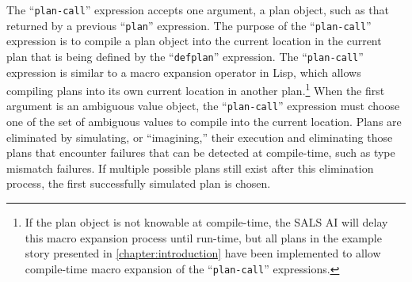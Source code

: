The ``{\tt{plan-call}}'' expression accepts one argument, a plan
object, such as that returned by a previous ``{\tt{plan}}''
expression.  The purpose of the ``{\tt{plan-call}}'' expression is to
compile a plan object into the current location in the current plan
that is being defined by the ``{\tt{defplan}}'' expression.  The
``{\tt{plan-call}}'' expression is similar to a macro expansion
operator in Lisp, which allows compiling plans into its own current
location in another plan.\footnote{If the plan object is not knowable
  at compile-time, the SALS AI will delay this macro expansion process
  until run-time, but all plans in the example story presented in
  {\mbox{\autoref{chapter:introduction}}} have been implemented to
  allow compile-time macro expansion of the ``{\tt{plan-call}}''
  expressions.}  When the first argument is an ambiguous value object,
the ``{\tt{plan-call}}'' expression must choose one of the set of
ambiguous values to compile into the current location.  Plans are
eliminated by simulating, or ``imagining,'' their execution and
eliminating those plans that encounter failures that can be detected
at compile-time, such as type mismatch failures.  If multiple possible
plans still exist after this elimination process, the first
successfully simulated plan is chosen.

